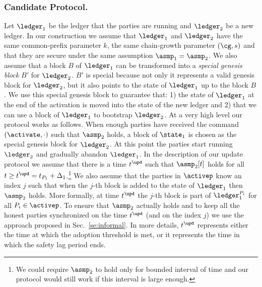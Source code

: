 \subsubsection{Candidate Protocol.}

Let $\ledger_1$ be the ledger that the parties are running and $\ledger_2$ be a new ledger.
In our construction we assume that $\ledger_1$ and $\ledger_2$ have the same common-prefix parameter $k$, the same chain-growth parameter $(\cg, s)$ and that they are secure under the same assumption $\asmp_1=\asmp_2$. We also assume that a block $B$ of $\ledger_1$ can be transformed into a \emph{special genesis block} $B'$ for $\ledger_2$. $B'$ is special because not only
it represents a valid genesis block for $\ledger_2$, but it also points to the state of $\ledger_1$ up to the block $B$. 
We use this special genesis block to guarantee that: 1) the state of $\ledger_1$ at the end of the activation is moved into the state of the new ledger
and 2) that we can use a block of $\ledger_1$ to bootstrap $\ledger_2$.
At a very high level our protocol works as follows. When enough parties have received the command $(\activate,\cdot)$ such that $\asmp_2$ holds,
a block of $\state_1$ is chosen as the special genesis block for $\ledger_2$. At this point the parties start running $\ledger_2$ and gradually abandon 
$\ledger_1$.
In the description of our update protocol we assume that there is a time $t^\upd$ such that $\asmp_2[t]$ holds for all $t\geq t^\upd=t_{P_1}+\Delta_1$.\footnote{We could require $\asmp_2$ to
hold only for bounded interval of time and our protocol would still work if this interval is large enough.}
We also assume that the parties in $\activep$ know an index $j$ such that when the $j$-th block is added to the state of $\ledger_1$ then $\asmp_2$ holds. 
More formally, at time $t^\upd$ the $j$-th block is part of $\ledger_1^{P_i}$ for all $P_i\in\activep$.
To ensure that $\asmp_2$ actually holds and to keep all the honest parties synchronized on the time $t^\upd$ (and on the index $j$) we use the approach proposed in Sec.~\ref{se:informal}.
In more details, $t^\upd$ represents either the time at which the adoption threshold is met, or it represents the time in which the safety lag period ends.
 


